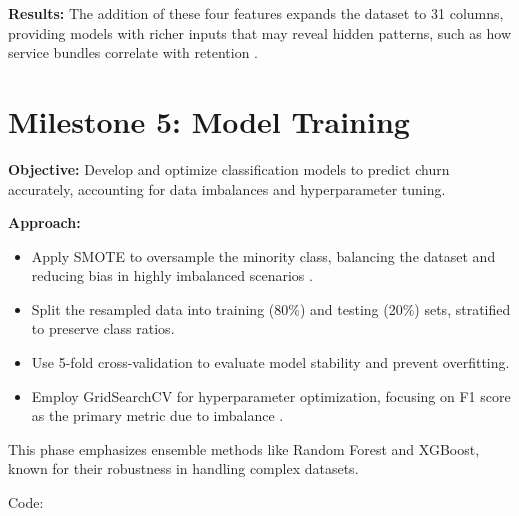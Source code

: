 \documentclass[preprint, 3p,
authoryear]{elsarticle} %
\providecommand{\tightlist}{%
  \setlength{\itemsep}{0pt}\setlength{\parskip}{0pt}}
\begin{document}
\textbf{Results:} The addition of these four features expands the
dataset to 31 columns, providing models with richer inputs that may
reveal hidden patterns, such as how service bundles correlate with
retention \citep{nargesian2017learning}.

\section{Milestone 5: Model Training}\label{milestone-5-model-training}

\textbf{Objective:} Develop and optimize classification models to
predict churn accurately, accounting for data imbalances and
hyperparameter tuning.

\textbf{Approach:}

\begin{itemize}
\tightlist
\item
  Apply SMOTE to oversample the minority class, balancing the dataset
  and reducing bias in highly imbalanced scenarios
  \citep{kaya2019impact}.
\item
  Split the resampled data into training (80\%) and testing (20\%) sets,
  stratified to preserve class ratios.
\item
  Use 5-fold cross-validation to evaluate model stability and prevent
  overfitting.
\item
  Employ GridSearchCV for hyperparameter optimization, focusing on F1
  score as the primary metric due to imbalance \citep{ding2018model}.
\end{itemize}

This phase emphasizes ensemble methods like Random Forest and XGBoost,
known for their robustness in handling complex datasets.

Code:
\end{document}
